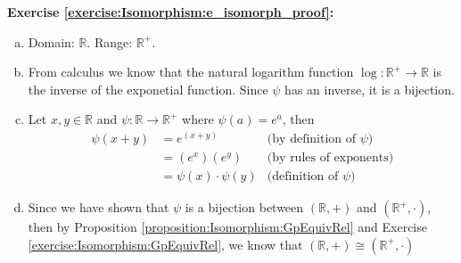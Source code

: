 \noindent\textbf{Exercise \ref{exercise:Isomorphism:e_isomorph_proof}:}
\begin{enumerate}[(a)]
\item
Domain: ${\mathbb R}$.  Range: ${\mathbb R}^+$.

\item
From calculus we know that the natural logarithm function $\log: {\mathbb R}^+ \rightarrow {\mathbb R}$ is the inverse of the exponetial function.  Since $\psi$ has an inverse, it is a bijection.  

\item
Let $x, y \in {\mathbb R}$ and $\psi: {\mathbb R} \rightarrow {\mathbb R}^+$ where $\psi(a) = e^a$, then
\begin{align*}
\psi(x + y) &= e^{(x + y)} &\text{(by definition of\ } \psi)
\\
&= (e^x)(e^y) &\text{(by rules of exponents)}
\\
&= \psi(x) \cdot \psi(y) &\text{(definition of\ } \psi)
\end{align*}

\item
Since we have shown that $\psi$ is a bijection between $({\mathbb R},+)$ and $({\mathbb R}^+,\cdot)$, then by Proposition \ref{proposition:Isomorphism:GpEquivRel} and Exercise \ref{exercise:Isomorphism:GpEquivRel}, we know that $({\mathbb R},+) \cong ({\mathbb R}^+,\cdot)$
\\
\end{enumerate}

